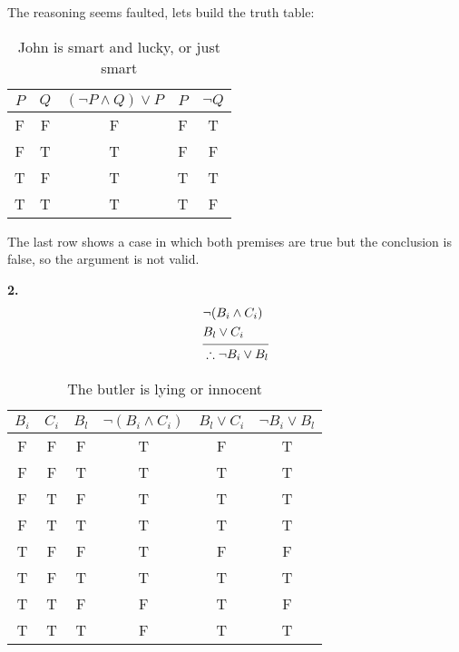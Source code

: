   The reasoning seems faulted, lets build the truth table:

  \begin{table}[h]
  \centering
  \label{tab:smart_and_lucky }
  \begin{tabular}{|c|c|c|c|c|}
    \hline
    $P$ & $Q$ &  $(\neg P \land Q) \lor P$ & $P$ & $\neg Q$\\
    \hline 
    F & F & F & F & T\\   
    F & T & T & F & F\\
    T & F & T & T & T\\
    T & T & T & T & F\\ 
    \hline
  \end{tabular}
  \caption{John is smart and lucky, or just smart}
\end{table}

The last row shows a case in which both premises are true but the conclusion is false, so the argument is not valid.

\sol \textbf{2.} 
  \begin{align*}
      &\neg (B_i \land C_i)\\
      &B_l \lor C_i\\
            \noalign{\vspace{-8pt}}
            \cline{1-2}
            \noalign{\vspace{-4pt}}
      &\therefore \neg B_i \lor B_l\\
  \end{align*}

  \begin{table}[h]
  \centering
  \label{tab:lying_or_innocent }
  \begin{tabular}{|c|c|c|c|c|c|}
    \hline
    $B_i$ & $C_i$ & $B_l$ & $\neg (B_i \land C_i)$ & $B_l \lor C_i$ & $\neg B_i \lor B_l$\\ 
    \hline 
    F & F & F & T & F & T\\ 
    F & F & T & T & T & T\\ 
    F & T & F & T & T & T\\ 
    F & T & T & T & T & T\\   
    T & F & F & T & F & F\\
    T & F & T & T & T & T\\
    T & T & F & F & T & F\\
    T & T & T & F & T & T\\    
    \hline
  \end{tabular}
  \caption{The butler is lying or innocent}
\end{table}


